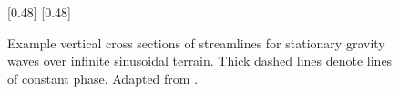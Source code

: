 \begin{figure}
	\centering
	\captionsetup[subfigure]{position=b}
	\centering
	[0.48\textwidth]{}
	\hfill
	[0.48\textwidth]{}
%
	\caption{Example vertical cross sections of streamlines for stationary gravity waves over infinite sinusoidal terrain.  Thick dashed lines denote lines of constant phase.  Adapted from \textcite{lynch-cassano2006}.}
	\label{fig:theory:gw:stationary-waves}
\end{figure}

